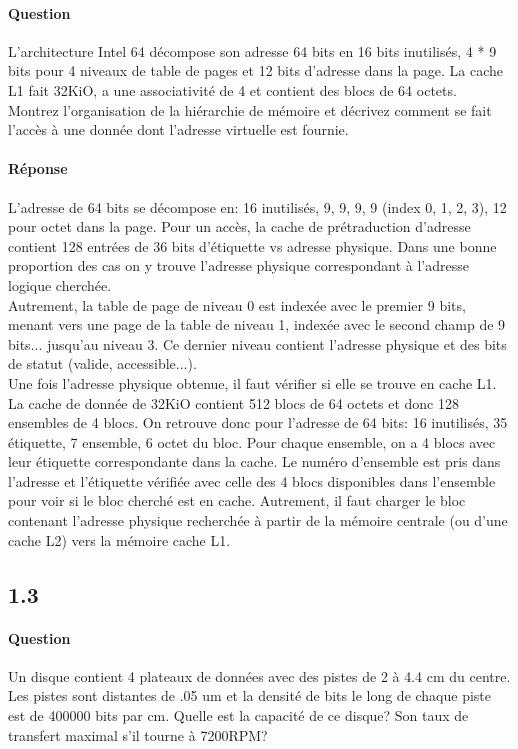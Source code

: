 \documentclass[oneside]{book}
\begin{document}
\paragraph{Question}
L'architecture Intel 64 décompose son adresse 64 bits en 16 bits inutilisés, 4 * 9
bits pour 4 niveaux de table de pages et 12 bits d'adresse dans la page. La cache
L1 fait 32KiO, a une associativité de 4 et contient des blocs de 64 octets. Montrez
l'organisation de la hiérarchie de mémoire et décrivez comment se fait l'accès à
une donnée dont l'adresse virtuelle est fournie.

\paragraph{Réponse}
L'adresse de 64 bits se décompose en: 16 inutilisés, 9, 9, 9, 9 (index 0, 1, 2, 3),
12 pour octet dans la page. Pour un accès, la cache de prétraduction d'adresse
contient 128 entrées de 36 bits d'étiquette vs adresse physique. Dans une bonne
proportion des cas on y trouve l'adresse physique correspondant à l'adresse
logique cherchée.\\

Autrement, la table de page de niveau 0 est indexée avec le premier 9 bits,
menant vers une page de la table de niveau 1, indexée avec le second champ de
9 bits... jusqu'au niveau 3. Ce dernier niveau contient l'adresse physique et des
bits de statut (valide, accessible...).\\

Une fois l'adresse physique obtenue, il faut vérifier si elle se trouve en cache L1.
La cache de donnée de 32KiO contient 512 blocs de 64 octets et donc 128
ensembles de 4 blocs. On retrouve donc pour l'adresse de 64 bits: 16 inutilisés,
35 étiquette, 7 ensemble, 6 octet du bloc. Pour chaque ensemble, on a 4 blocs
avec leur étiquette correspondante dans la cache. Le numéro d'ensemble est
pris dans l'adresse et l'étiquette vérifiée avec celle des 4 blocs disponibles dans
l'ensemble pour voir si le bloc cherché est en cache. Autrement, il faut charger le
bloc contenant l'adresse physique recherchée à partir de la mémoire centrale (ou
d'une cache L2) vers la mémoire cache L1.
\subsection{1.3}
\paragraph{Question}
Un disque contient 4 plateaux de données avec des pistes de 2 à 4.4 cm du
centre. Les pistes sont distantes de .05 um et la densité de bits le long de chaque
piste est de 400000 bits par cm. Quelle est la capacité de ce disque? Son taux de
transfert maximal s'il tourne à 7200RPM?
\end{document}
